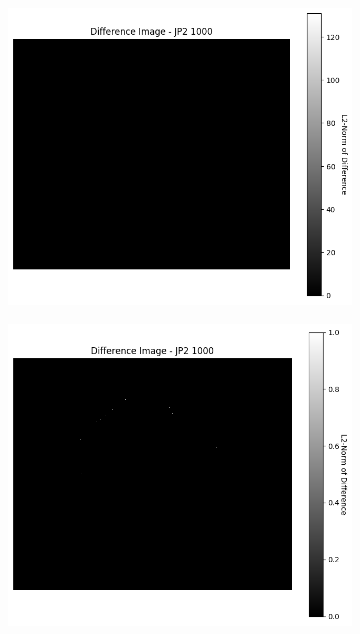 \begin{figure}[htb]
\begin{subfigure}[b]{0.48\textwidth}
        \caption{}
        \label{fig:img_quality_comp_jp2_1000_histo}
    \end{subfigure}
    \\
    \begin{subfigure}[b]{0.48\textwidth}
        \centering
        \includegraphics[width=\textwidth]{doc/thesis/0_figures/compare_quality/set1/jp2_1000_diff_heatmap.png}
        \caption{}
        \label{fig:img_quality_comp_jp2_1000_diff}
    \end{subfigure}
    \begin{subfigure}[b]{0.48\textwidth}
        \centering
        \includegraphics[width=\textwidth]{doc/thesis/0_figures/compare_quality/set1/jp2_1000_diff_heatmap_rel.png}

\end{subfigure}
\end{figure}
